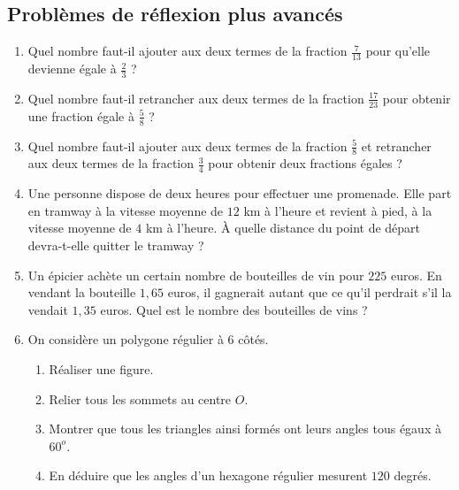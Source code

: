 \documentclass[14pt]{extreport}
\newcounter{n}
\theoremstyle{plain}
\begin{document}
    \subsection*{Problèmes de réflexion plus avancés}
\begin{enumerate}
\item Quel nombre faut-il ajouter aux deux termes de la fraction $\frac7{13}$ pour qu'elle devienne égale à $\frac23$ ? 
 \item Quel nombre faut-il retrancher aux deux termes de la fraction $\frac{17}{23}$ pour obtenir une fraction égale à $\frac58$ ? 
 \item Quel nombre faut-il ajouter aux deux termes de la fraction $\frac58$ et retrancher aux deux termes de la fraction $\frac34$ pour obtenir deux fractions égales ? 
 \item Une personne dispose de deux heures pour effectuer une promenade. Elle part en tramway à la vitesse moyenne de $12$ km à l'heure et revient à pied, à la vitesse moyenne de $4$ km à l'heure. À quelle distance du point de départ devra-t-elle quitter le tramway ? 
 \item Un épicier achète un certain nombre de bouteilles de vin pour $225$ euros. En vendant la bouteille $1,65$ euros, il gagnerait autant que ce qu'il perdrait s'il la vendait $1,35$ euros. Quel est le nombre des bouteilles de vins ? 
 
 \item On considère un polygone régulier à $6$ côtés.
 \begin{enumerate}
 \item Réaliser une figure.
 \item Relier tous les sommets au centre $O$. 
 \item Montrer que tous les triangles ainsi formés ont leurs angles tous égaux à $60^o$. 
 \item En déduire que les angles d'un hexagone régulier mesurent $120$ degrés.
\end{enumerate}   


\end{enumerate}
\end{document}
